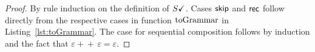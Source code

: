 \begin{proof}
  By rule induction on the definition of $S\checkmark$. Cases $\mathsf{skip}$ and
  $\mathsf{rec}$ follow directly from the respective cases in function
  $\toGrammark$ in Listing~\ref{lst:toGrammar}. The case for
  sequential composition follows by induction and the fact that
  $\varepsilon+\!\!+\,\varepsilon=\varepsilon$.
\end{proof}

